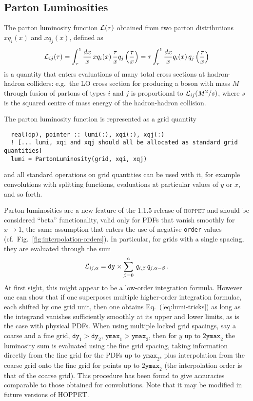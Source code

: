 \documentclass[12pt]{article}
\newcommand{\hoppet}{\textsc{hoppet}\xspace}
\newcommand{\ttt}[1]{\texttt{#1}}
\begin{document}
\subsection{Parton Luminosities}
\label{sec:parton-luminosities}

The parton luminosity function ${\cal L}(\tau)$ obtained from two
parton distributions $x q_i(x)$ and $x q_j(x)$, defined as
\begin{equation}
  \label{eq:parton-lumi}
  {\cal L}_{ij}(\tau) = \int_{\tau}^1 \frac{dx}{x} \,  x q_i(x) \, \frac{\tau}{x}
  q_j\left(\frac{\tau}{x} \right) 
  = 
  \tau \int_{\tau}^1 \frac{dx}{x}   q_i(x) \,
  q_j\left(\frac{\tau}{x} \right)
\end{equation}
is a quantity that enters evaluations of many total cross sections at
hadron-hadron colliders: e.g.\ the LO cross section for producing a
boson with mass $M$ through fusion of partons of types $i$ and $j$ is
proportional to ${\cal L}_{ij}(M^2/s)$, where $s$ is the squared centre of
mass energy of the hadron-hadron collision.

The parton luminosity function is represented as a grid quantity
\begin{lstlisting}
  real(dp), pointer :: lumi(:), xqi(:), xqj(:)
  ! [... lumi, xqi and xqj should all be allocated as standard grid quantities]
  lumi = PartonLuminosity(grid, xqi, xqj)
\end{lstlisting}
and all standard operations on grid quantities can be used with it,
for example convolutions with splitting functions, evaluations at
particular values of $y$ or $x$, and so forth.

Parton luminosities are a new feature of the 1.1.5 release of \hoppet
and should be considered ``beta'' functionality, valid only for PDFs
that vanish smoothly for $x\to 1$, the same assumption that enters
the use of negative \ttt{order} values (cf.\
Fig.~\ref{fig:interpolation-orders}). 
%
In particular, for grids with a single spacing, they are evaluated
through the sum
\begin{equation}
  \label{eq:lumi-tricks}
  {\cal L}_{ij,\alpha} = \texttt{dy} \times \sum_{\beta=0}^{\alpha}
  \,q_{i,\beta}\, q_{j,\alpha-\beta} \,.
\end{equation}
At first sight, this might appear to be a low-order integration
formula.
%
However one can show that if one superposes multiple higher-order
integration formulae, each shifted by one grid unit, then one obtains
Eq.~(\ref{eq:lumi-tricks}) as long as the integrand vanishes
sufficiently smoothly at its upper and lower limits, as is the case
with physical PDFs.
%
When using multiple locked grid spacings, say a coarse and a fine
grid, $\ttt{dy}_1 > \ttt{dy}_{2}$, $\ttt{ymax}_1 > \ttt{ymax}_{2}$,
then for $y$ up to $2\ttt{ymax}_2$ the luminosity sum is evaluated
using the fine grid spacing, taking information directly from the fine
grid for the PDFs up to $\ttt{ymax}_2$, plus interpolation from
the coarse grid onto the fine grid for points up to $2\ttt{ymax}_2$
(the interpolation order is that of the coarse grid).
%
This procedure has been found to give accuracies comparable to those obtained
for convolutions. 
%
Note that it may be modified in future versions of HOPPET.
\end{document}

